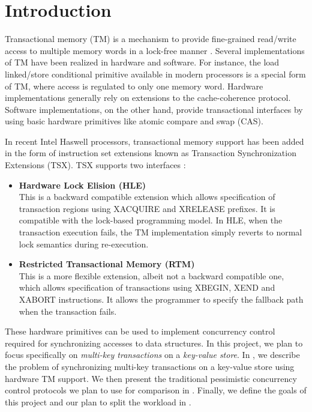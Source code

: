 \section{Introduction} \label{sec:intro}

Transactional memory (TM) is a mechanism to provide
fine-grained read/write access to multiple memory words in a lock-free manner
\citep{Herlihy93}. Several implementations of TM have been realized in hardware
and software. For instance, the load linked/store conditional primitive available
in modern processors is a special form of TM, where access is regulated to only
one memory word. Hardware implementations generally rely on extensions to the
cache-coherence protocol. Software implementations, on the other hand, provide
transactional interfaces by using basic hardware primitives like atomic compare and
swap (CAS).

In recent Intel Haswell processors, transactional memory support has been added
in the form of instruction set extensions known as Transaction Synchronization
Extensions (TSX). TSX supports two interfaces \citep{tsx-intro}: \\

\begin{itemize} 
\item \textbf{Hardware Lock Elision (HLE)} \\ This is a backward
compatible extension which allows specification of transaction regions using
\textrm{XACQUIRE} and \textrm{XRELEASE} prefixes. It is compatible with the lock-based programming
model. In HLE, when the transaction execution fails, the TM implementation
simply reverts to normal lock semantics during re-execution. \\ 

\item \textbf{Restricted Transactional Memory (RTM)} \\ This is a more
flexible extension, albeit not a backward compatible one, which allows specification of
transactions using \textrm{XBEGIN, XEND and XABORT} instructions. It allows the
programmer to specify the fallback path when the transaction fails.  \\ 
\end{itemize}

These hardware primitives can be used to implement concurrency control 
required for synchronizing accesses to data structures. In this project,
we plan to focus specifically on \textit{multi-key transactions} on a
\textit{key-value store}. In ,
we describe the problem of synchronizing multi-key transactions on a 
key-value store using hardware TM support.
We then present the traditional pessimistic concurrency control protocols 
we plan to use for comparison in . Finally, we
define the goals of this project and our plan to split the workload
in .
